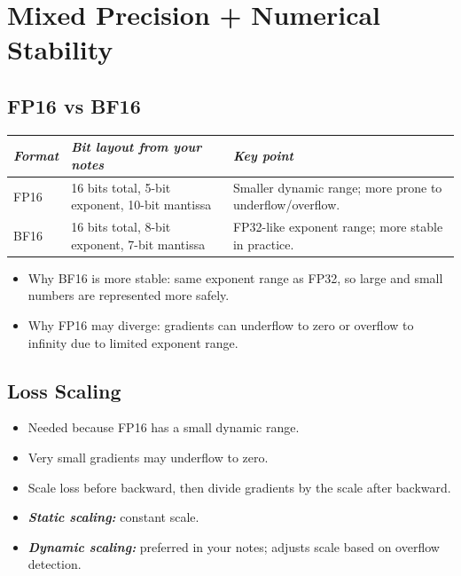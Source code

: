 \documentclass[12pt]{article}
\let\origtextbf\textbf
\renewcommand{\textbf}[1]{\origtextbf{\textit{#1}}}
\begin{document}
\vspace{2cm}

\section{Mixed Precision + Numerical Stability}

\subsection{FP16 vs BF16}
{\footnotesize
\begin{tabularx}{\textwidth}{|>{\raggedright\arraybackslash}p{2.2cm}|X|X|}
\hline
\textbf{Format} & \textbf{Bit layout from your notes} & \textbf{Key point} \\
\hline
FP16 & 16 bits total, 5-bit exponent, 10-bit mantissa & Smaller dynamic range; more prone to underflow/overflow. \\
\hline
BF16 & 16 bits total, 8-bit exponent, 7-bit mantissa & FP32-like exponent range; more stable in practice. \\
\hline
\end{tabularx}
}

\begin{itemize}
\item Why BF16 is more stable: same exponent range as FP32, so large and small numbers are represented more safely.
\item Why FP16 may diverge: gradients can underflow to zero or overflow to infinity due to limited exponent range.
\end{itemize}

\subsection{Loss Scaling}
\begin{itemize}
\item Needed because FP16 has a small dynamic range.
\item Very small gradients may underflow to zero.
\item Scale loss before backward, then divide gradients by the scale after backward.
\item \textbf{Static scaling:} constant scale.
\item \textbf{Dynamic scaling:} preferred in your notes; adjusts scale based on overflow detection.
\end{itemize}
\end{document}
